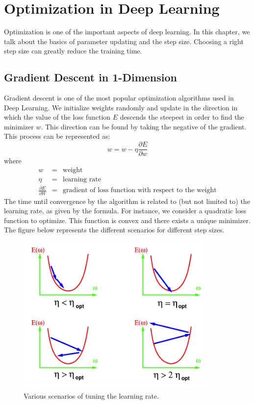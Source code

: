 
\chapter{Optimization in Deep Learning}

Optimization is one of the important aspects of deep learning. In this chapter, we talk about the basics of parameter updating and the step size. Choosing a right step size can greatly reduce the training time. 

\section{Gradient Descent in 1-Dimension}
Gradient descent is one of the most popular optimization algorithms used in Deep Learning. We initialize weights randomly and update in the direction in which the value of the loss function $E$ descends the steepest in order to find the minimizer $w$. This direction can be found by taking the negative of the gradient. This process can be represented as:
$$ w = w - \eta\frac{\partial E}{\partial w}$$
where
\begin{eqnarray*}
w &=& \text{weight}\\
\eta &=& \text{learning rate}\\
\frac{\partial E}{\partial W} &=& \text{gradient of loss function with respect to the weight}
\end{eqnarray*}
The time until convergence by the algorithm is related to (but not limited to) the learning rate, as given by the formula. For instance, we consider a quadratic loss function to optimize. This function is convex and there exists a unique minimizer. The figure below represents the different scenarios for different step sizes.

\begin{figure}[t]
\centering
\includegraphics[width=100mm]{lectures/07-a/quadratic_function_to_optimise.png}
\caption{Various scenarios of tuning the learning rate.}
\end{figure}

